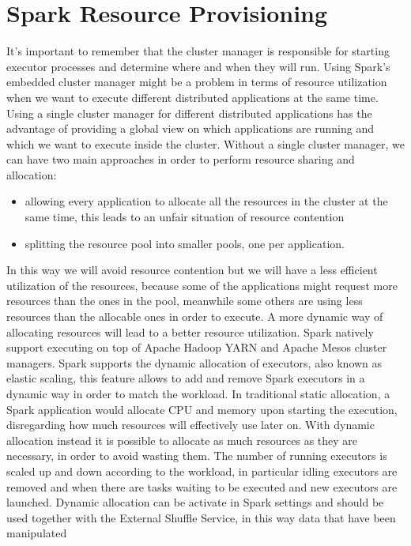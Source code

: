 \section{Spark Resource Provisioning}\label{sec:spark_resource_provisioning}
It's important to remember that the cluster manager is responsible for starting executor processes and determine where and when they will run. Using Spark’s embedded cluster manager might be a problem in terms of resource utilization when we want to execute different distributed applications at the same time. Using a single cluster manager for different distributed applications has the advantage of providing a global view on which applications are running and which we want to execute inside the cluster.
Without a single cluster manager, we can have two main approaches
in order to perform resource sharing and allocation:
\begin{itemize}
	\item  allowing every application to allocate all the resources in the cluster at the same time, this leads to an unfair situation of resource contention
	\item splitting the resource pool into smaller pools, one per application.
\end{itemize}
In this way we will avoid resource contention but we will
have a less efficient utilization of the resources, because some of
the applications might request more resources than the ones in
the pool, meanwhile some others are using less resources than
the allocable ones in order to execute.
A more dynamic way of allocating resources will lead to a better resource
utilization. Spark natively support executing on top of Apache
Hadoop YARN and Apache Mesos cluster managers.
Spark supports the dynamic allocation of executors, also known as
elastic scaling, this feature allows to add and remove Spark executors
in a dynamic way in order to match the workload.
In traditional static allocation, a Spark application would allocate
CPU and memory upon starting the execution, disregarding how
much resources will effectively use later on. With dynamic allocation
instead it is possible to allocate as much resources as they are
necessary, in order to avoid wasting them. The number of running
executors is scaled up and down according to the workload, in particular
idling executors are removed and when there are tasks waiting
to be executed and new executors are launched. Dynamic allocation can 
be activate in Spark settings and should be used together with the
External Shuffle Service, in this way data that have been manipulated
